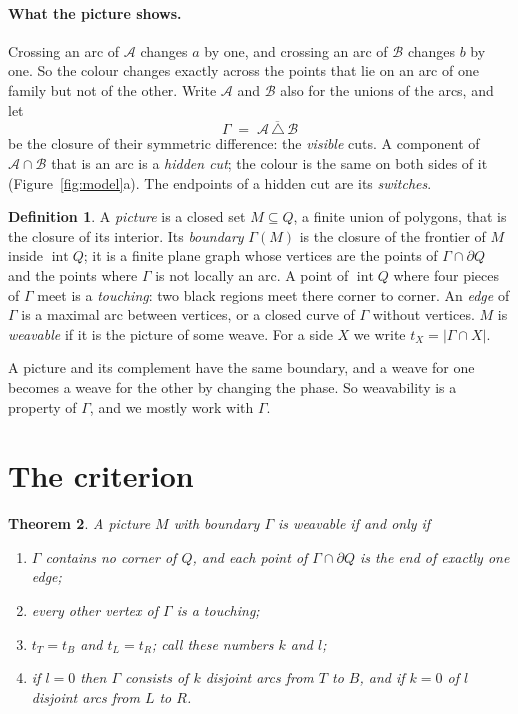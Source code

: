 \documentclass[11pt,a4paper]{article}
\newtheorem{theorem}{Theorem}
\theoremstyle{definition}
\newtheorem{definition}[theorem]{Definition}
\theoremstyle{remark}
\newcommand{\A}{\mathcal{A}}
\newcommand{\B}{\mathcal{B}}
\newcommand{\intr}{\operatorname{int}}
\newcommand{\bd}{\partial}
\begin{document}
\paragraph{What the picture shows.}
Crossing an arc of $\A$ changes $a$ by one, and crossing an arc of $\B$
changes $b$ by one. So the colour changes exactly across the points that lie
on an arc of one family but not of the other. Write $\A$ and $\B$ also for
the unions of the arcs, and let
\[
  \Gamma \;=\; \overline{\A\,\triangle\,\B}
\]
be the closure of their symmetric difference: the \emph{visible} cuts. A
component of $\A\cap\B$ that is an arc is a \emph{hidden cut}; the colour is
the same on both sides of it (Figure~\ref{fig:model}a). The endpoints of a
hidden cut are its \emph{switches}.

\begin{definition}
A \emph{picture} is a closed set $M\subseteq Q$, a finite union of polygons,
that is the closure of its interior. Its \emph{boundary} $\Gamma(M)$ is the
closure of the frontier of $M$ inside $\intr Q$; it is a finite plane graph
whose vertices are the points of $\Gamma\cap\bd Q$ and the points where
$\Gamma$ is not locally an arc. A point of $\intr Q$ where four pieces of
$\Gamma$ meet is a \emph{touching}: two black regions meet there corner to
corner. An \emph{edge} of $\Gamma$ is a maximal arc between vertices, or a
closed curve of $\Gamma$ without vertices. $M$ is \emph{weavable} if it is
the picture of some weave. For a side $X$ we write $t_X=|\Gamma\cap X|$.
\end{definition}

A picture and its complement have the same boundary, and a weave for one
becomes a weave for the other by changing the phase. So weavability is a
property of $\Gamma$, and we mostly work with $\Gamma$.

\section{The criterion}

\begin{theorem}\label{thm:main}
A picture $M$ with boundary $\Gamma$ is weavable if and only if
\begin{enumerate}[label=\textup{(\roman*)}]
\item $\Gamma$ contains no corner of $Q$, and each point of
  $\Gamma\cap\bd Q$ is the end of exactly one edge;
\item every other vertex of $\Gamma$ is a touching;
\item $t_T=t_B$ and $t_L=t_R$; call these numbers $k$ and $l$;
\item if $l=0$ then $\Gamma$ consists of $k$ disjoint arcs from $T$ to $B$,
  and if $k=0$ of $l$ disjoint arcs from $L$ to $R$.
\end{enumerate}
\end{theorem}
\end{document}
